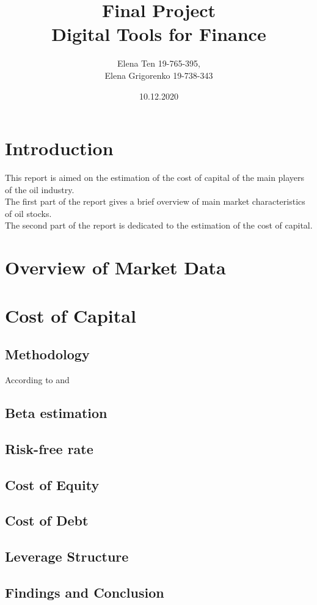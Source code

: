 \documentclass [a4paper, 11pt] {article}
\begin{document}
\title {\Huge Final Project \\
 \Huge Digital Tools for Finance }
\author {\huge Elena Ten 19-765-395, \\
	 	 \huge Elena Grigorenko 19-738-343}

\date {\huge 10.12.2020}



\maketitle
\thispagestyle{empty}

\newpage

\tableofcontents

\newpage

\section {Introduction}
This report is aimed on the estimation of the cost of capital of the main players of the oil industry.\\
The first part of the report gives a brief overview of main market characteristics of oil stocks.\\
The second part of the report is dedicated to the estimation of the cost of capital.

\section {Overview of Market Data}

\section {Cost of Capital}
\subsection {Methodology}

According to \cite{DamodaranDark} and \cite{BestPract}


\subsection {Beta estimation}
\subsection {Risk-free rate}
\subsection {Cost of Equity}
\subsection {Cost of Debt}
\subsection {Leverage Structure}
\subsection {Findings and Conclusion}

\newpage
\printbibliography [heading=bibintoc]
\end{document}
